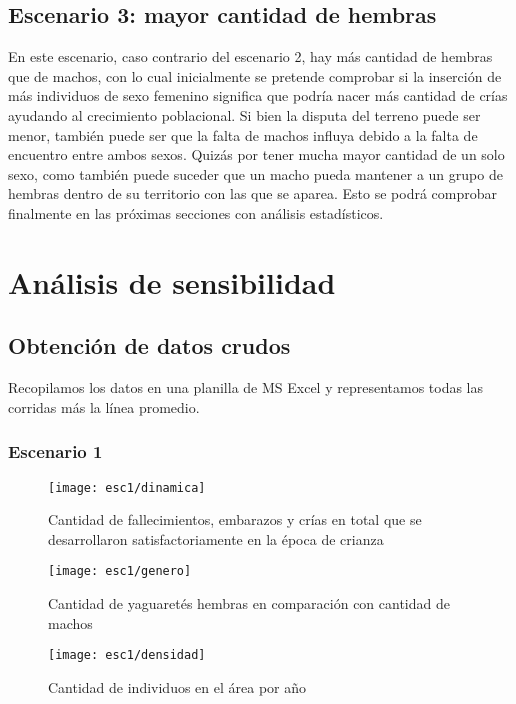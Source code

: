     \subsection{Escenario 3: mayor cantidad de hembras}
      En este escenario, caso contrario del escenario 2, hay más cantidad de hembras que de machos, con lo cual inicialmente se pretende comprobar si la inserción de más individuos de sexo femenino significa que podría nacer más cantidad de crías ayudando al crecimiento poblacional. Si bien la disputa del terreno puede ser menor, también puede ser que la falta de machos influya debido a la falta de encuentro entre ambos sexos. Quizás por tener mucha mayor cantidad de un solo sexo, como también puede suceder que un macho pueda mantener a un grupo de hembras dentro de su territorio con las que se aparea. Esto se podrá comprobar finalmente en las próximas secciones con análisis estadísticos.

    \section{Análisis de sensibilidad}

\subsection{Obtención de datos crudos}

Recopilamos los datos en una planilla de MS Excel y representamos todas las corridas más la línea promedio.

\subsubsection{Escenario 1}

\begin{figure}[H]
    \texttt{[image: esc1/dinamica]}
    \caption{Cantidad de fallecimientos, embarazos y crías en total que se desarrollaron satisfactoriamente en la época de crianza}\label{fig:fig1-1}
    \endminipage\hfill
    \texttt{[image: esc1/genero]}
    \caption{Cantidad de yaguaretés hembras en comparación con cantidad de machos}\label{fig:fig1-2}
    \endminipage\hfill
    \texttt{[image: esc1/densidad]}
    \caption{Cantidad de individuos en el área por año}\label{fig:fig1-3}
    \endminipage
\end{figure}

